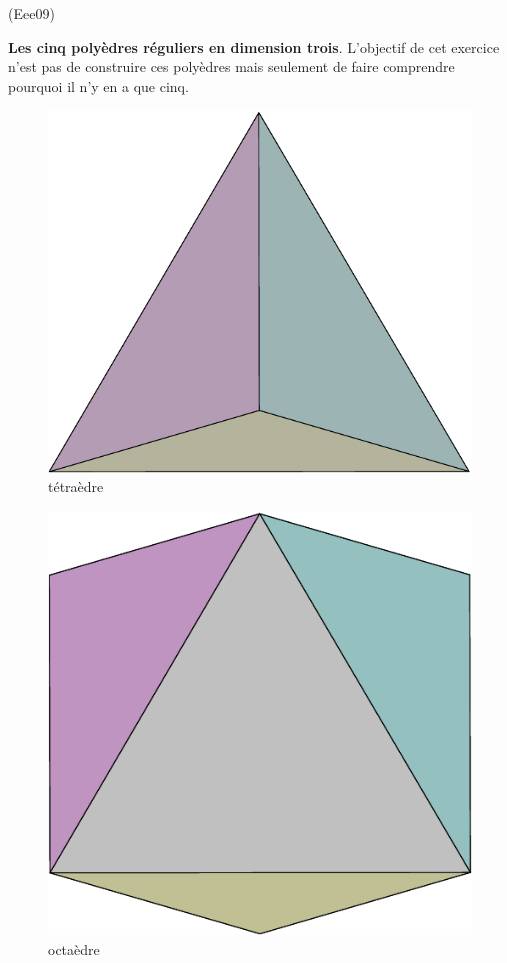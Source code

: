 \begin{tiny}(Eee09)\end{tiny}
 \textbf{Les cinq polyèdres réguliers en dimension trois}.\newline
L'objectif de cet exercice n'est pas de construire ces polyèdres mais seulement de faire comprendre pourquoi il n'y en a que cinq.
\begin{figure}[ht]
   \centering
   \includegraphics[scale=0.25]{Eee09_1.pdf}
   \caption{tétraèdre}
   \label{fig:1}
\end{figure}

\begin{figure}[ht]
   \centering
   \includegraphics[scale=0.25]{Eee09_2.pdf}
   \caption{octaèdre}
   \label{fig:2}
\end{figure}

